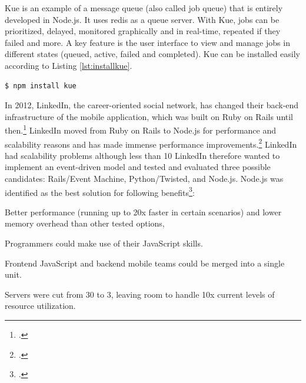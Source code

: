 \begin{appendices}
\begin{subappendices}
Kue is an example of a message queue (also called job queue) that is entirely developed in Node.js. It uses redis as a queue server. With Kue, jobs can be prioritized, delayed, monitored graphically and in real-time, repeated if they failed and more. A key feature is the user interface to view and manage jobs in different states (queued, active, failed and completed). Kue can be installed easily according to Listing \ref{lst:installkue}.

\begin{lstlisting}[language=javascript,caption={Installing Kue via command-line},label=lst:installkue]
$ npm install kue 
\end{lstlisting}

In 2012, LinkedIn, the career-oriented social network, has changed their back-end infrastructure of the mobile application, which was built on Ruby on Rails until then.\footcite[Cf.][]{Avram_2012} LinkedIn moved from Ruby on Rails to Node.js for performance and scalability reasons and has made immense performance improvements.\footcite[Cf.][]{ODell_2011} 
LinkedIn had scalability problems although less than 10%
LinkedIn therefore wanted to implement an event-driven model and tested and evaluated three possible candidates: Rails/Event Machine, Python/Twisted, and Node.js.
Node.js was identified as the best solution for following benefits\footcite[Cf.][]{Avram_2012}:
\begin{description}
  \item Better performance (running up to 20x faster in certain scenarios) and lower memory overhead than other tested options, 
  \item Programmers could make use of their JavaScript skills. 
  \item Frontend JavaScript and backend mobile teams could be merged into a single unit. 
  \item Servers were cut from 30 to 3, leaving room to handle 10x current levels of resource utilization.
\end{description}



\end{subappendices}
\end{appendices}
